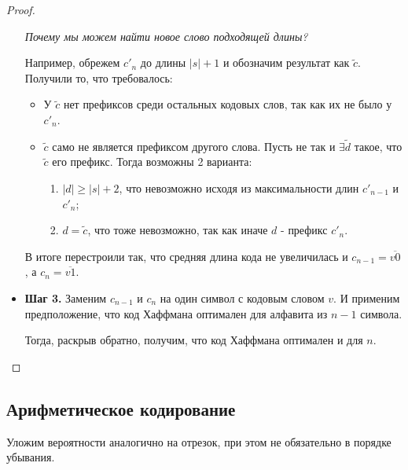 \begin{proof}
\begin{itemize}
		\textit{Почему мы можем найти новое слово подходящей длины?}
        
        Например, обрежем $ c'_n$ до длины $ |s| + 1$ и обозначим результат как $ \tilde c$. Получили то, что требовалось:
        \begin{itemize}
            \item У $ \tilde c$ нет префиксов среди остальных кодовых слов, так как их не было у $ c'_n$.
            \item $ \tilde c$ само не является префиксом другого слова. Пусть не так и $ \exists \tilde d$ такое, что $ \tilde c$ его префикс. Тогда возможны 2 варианта: 
            \begin{enumerate}
                \item  $ |d| \ge |s| + 2$, что невозможно исходя из максимальности длин $ c'_{n - 1}$ и $ c'_n$;
                \item $ d = \tilde c$, что тоже невозможно, так как иначе $ d$ - префикс $ c'_n$.
            \end{enumerate}
        \end{itemize} 




		В итоге перестроили так, что средняя длина кода не увеличилась и $c_{n-1} = \overline{v0}$, а $c_n = \overline{v1}$.
	\item \textbf{Шаг 3.} Заменим $c_{n-1}$ и $c_n$ на один символ с кодовым словом $v$.
		И применим предположение, что код Хаффмана оптимален для алфавита из $n-1$ символа.

		Тогда, раскрыв обратно, получим, что код Хаффмана оптимален и для $n$.
\end{itemize}
\end{proof}

\subsection{Арифметическое кодирование}
Уложим вероятности аналогично на отрезок, при этом не обязательно в порядке убывания.

